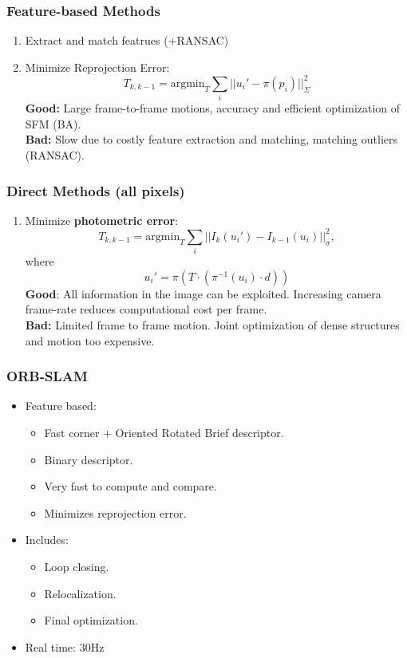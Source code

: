 \documentclass[a4paper,12 pt]{article}
\theoremstyle{definition}
\theoremstyle{remark}
\theoremstyle{definition}
\theoremstyle{definition}
\theoremstyle{definition}
\theoremstyle{remark}
\theoremstyle{definition}
\begin{document}
\subsubsection*{Feature-based Methods}
\begin{enumerate}
\item Extract and match featrues (+RANSAC)
\item Minimize Reprojection Error:
\begin{equation}
T_{k,k-1}=\text{argmin}_T\sum_{i}||u_i'-\pi(p_i)||_\Sigma^2
\end{equation}
\textbf{Good:} Large frame-to-frame motions, accuracy and efficient optimization of SFM (BA).\\
\textbf{Bad:} Slow due to costly feature extraction and matching, matching outliers (RANSAC).
\end{enumerate}
\subsubsection*{Direct Methods (all pixels)}
\begin{enumerate}
\item Minimize \textbf{photometric error}:
\begin{equation}
T_{k,k-1}=\text{argmin}_T\sum_{i}||I_k(u_i')-I_{k-1}(u_i)||_\sigma^2,
\end{equation}
where
\begin{equation}
u_i'=\pi(T\cdot (\pi^{-1}(u_i)\cdot d))
\end{equation}
\textbf{Good}: All information in the image can be exploited. Increasing camera frame-rate reduces computational cost per frame.\\
\textbf{Bad:} Limited frame to frame motion. Joint optimization of dense structures and motion too expensive.
\end{enumerate}

\subsubsection*{ORB-SLAM}
\begin{itemize}
\item Feature based:
\begin{itemize}
\item Fast corner + Oriented Rotated Brief descriptor.
\item Binary descriptor.
\item Very fast to compute and compare.
\item Minimizes reprojection error.
\end{itemize}
\item Includes:
\begin{itemize}
\item Loop closing.
\item Relocalization.
\item Final optimization.
\end{itemize}
\item Real time: 30Hz
\end{itemize}
\end{document}
